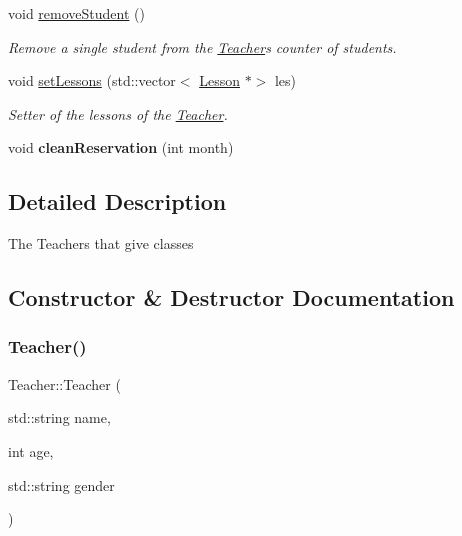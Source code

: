 \begin{DoxyCompactItemize}
\mbox{\label{class_teacher_a7bfb3b0541b17e3e06cb25b0fb89aa72}} 
void \mbox{\hyperlink{class_teacher_a7bfb3b0541b17e3e06cb25b0fb89aa72}{remove\+Student}} ()
\begin{DoxyCompactList}\small\item\em Remove a single student from the \mbox{\hyperlink{class_teacher}{Teacher}}\textquotesingle{}s counter of students. \end{DoxyCompactList}\item 
void \mbox{\hyperlink{class_teacher_a6c234671dbd738bee06f9a34bf11aca4}{set\+Lessons}} (std\+::vector$<$ \mbox{\hyperlink{class_lesson}{Lesson}} $\ast$$>$ les)
\begin{DoxyCompactList}\small\item\em Setter of the lessons of the \mbox{\hyperlink{class_teacher}{Teacher}}. \end{DoxyCompactList}\item 
\mbox{\label{class_teacher_a1a4387fc1b44bc9a46bf6fe0c90a8a47}} 
void {\bfseries clean\+Reservation} (int month)
\end{DoxyCompactItemize}


\subsection{Detailed Description}
The Teachers that give classes 

\subsection{Constructor \& Destructor Documentation}
\mbox{\label{class_teacher_adb308468e6ed8bbbffaba9cbf1ae646e}} 
\subsubsection{\texorpdfstring{Teacher()}{Teacher()}}
{\footnotesize\ttfamily Teacher\+::\+Teacher (\begin{DoxyParamCaption}\item[{std\+::string}]{name,  }\item[{int}]{age,  }\item[{std\+::string}]{gender }\end{DoxyParamCaption})}



